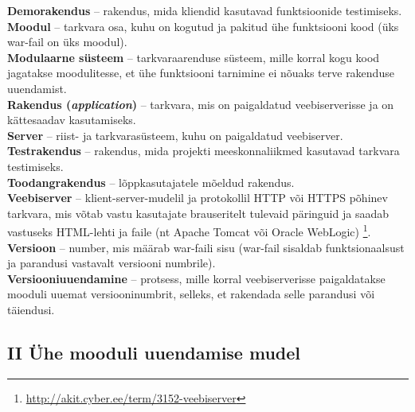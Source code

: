 \documentclass[12pt]{article}
\begin{document}
  \textbf{Demorakendus} \--- rakendus, mida kliendid kasutavad funktsioonide testimiseks.\\
  
  \textbf{Moodul} \--- tarkvara osa, kuhu on kogutud ja pakitud ühe funktsiooni kood (üks war\--fail on üks moodul).\\
  
  \textbf{Modulaarne süsteem} \--- tarkvaraarenduse süsteem, mille korral kogu kood jagatakse moodulitesse, et ühe funktsiooni tarnimine ei nõuaks terve rakenduse uuendamist.\\
  
  \textbf{Rakendus (\textit{application})} \--- tarkvara, mis on paigaldatud veebiserverisse ja on kättesaadav kasutamiseks.\\
  
  \textbf{Server} \--- riist- ja tarkvarasüsteem, kuhu on paigaldatud veebiserver.\\
  
  \textbf{Testrakendus} \--- rakendus, mida projekti meeskonnaliikmed kasutavad tarkvara testimiseks.\\
   
  \textbf{Toodangrakendus} \--- lõppkasutajatele mõeldud rakendus.\\
  
  \textbf{Veebiserver} \--- klient-server-mudelil ja protokollil HTTP või HTTPS põhinev tarkvara, mis võtab vastu kasutajate brauseritelt tulevaid päringuid ja saadab vastuseks HTML-lehti ja faile (nt Apache Tomcat või Oracle WebLogic) \footnote{\url{http://akit.cyber.ee/term/3152-veebiserver}}.\\
  
  \textbf{Versioon} \--- number, mis määrab war\--faili sisu (war\--fail sisaldab funktsionaalsust ja parandusi vastavalt versiooni numbrile).\\
  
  \textbf{Versiooniuuendamine} \--- protsess, mille korral veebiserverisse paigaldatakse mooduli uuemat versiooninumbrit, selleks, et rakendada selle parandusi või täiendusi.\\
  
  \newpage
  
  \subsection*{II Ühe mooduli uuendamise mudel}
  \label{bpmn-one}
  
\end{document}

